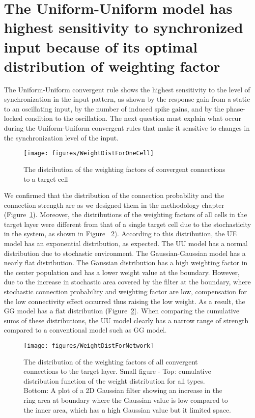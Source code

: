 \section{The Uniform-Uniform model has highest sensitivity to synchronized input because of its optimal distribution of weighting factor}
 The Uniform-Uniform convergent rule shows the highest sensitivity to the level of synchronization in the input pattern, as shown by the response gain from a static to an oscillating input, by the number of induced spike gains, and by the phase-locked condition to the oscillation.  The next question must explain what occur during the Uniform-Uniform convergent rules  that make it sensitive to changes in the synchronization level of the input.

\begin{figure}[!h]
	\centering
	\texttt{[image: figures/WeightDistForOneCell]}
	\caption{The distribution of the weighting factors of convergent connections to a target cell} 
	\label{fig:WdistOne}
\end{figure}

 We confirmed that the distribution of the connection probability and the connection strength are as we designed them in the methodology chapter (Figure~\ref{fig:WdistOne}). Moreover, the distributions of the weighting factors of all cells in the target layer were different from that of a single target cell due to the stochasticity in the system, as shown in Figure ~\ref{fig:WdistNN}). According to this distribution, the UE model has an exponential distribution, as expected. The UU model has a normal distribution due to stochastic environment. The Gaussian-Gaussian model has a nearly flat distribution. The Gaussian distribution has a high weighting factor in the center population and has a lower weight value at the boundary. However, due to the increase in stochastic area covered by the filter at the boundary, where stochastic connection probability and weighting factor are low, compensation for the low connectivity effect occurred thus raising the low weight. As a result, the GG model has a flat distribution (Figure~\ref{fig:WdistNN}).  When comparing the cumulative sums of these distributions, the UU model clearly has a narrow range of strength compared to a conventional model such as GG model.

\begin{figure}[!h]
	\centering
	\texttt{[image: figures/WeightDistForNetwork]}
	\caption{The distribution of the weighting factors of all convergent connections to the target layer. Small figure - Top: cumulative distribution function of the weight distribution for all types. Bottom: A plot of a 2D Gaussian filter showing an increase in the ring area at boundary where the Gaussian value is low compared to the inner area, which has a high Gaussian value but it limited space.} 
	\label{fig:WdistNN}
\end{figure}


